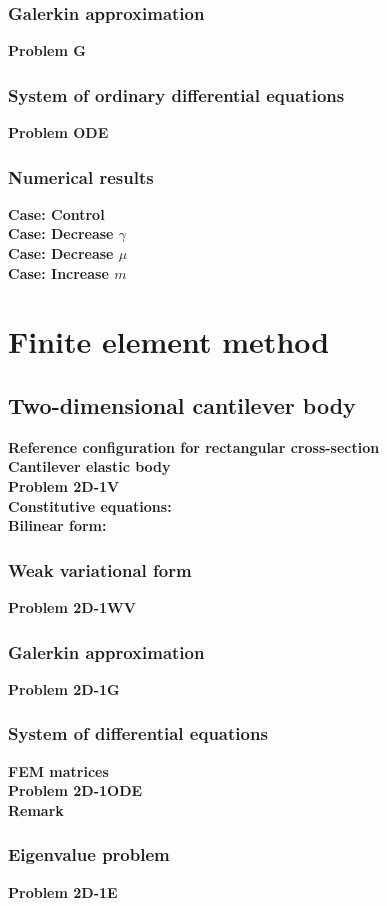 \documentclass[../main.tex]{subfiles}
\begin{document}
\subsubsection{Galerkin approximation}
\textbf{Problem G}
\subsubsection{System of ordinary differential equations}
\textbf{Problem ODE}
\subsubsection{Numerical results}
\textbf{Case: Control}\\
\textbf{Case: Decrease $\gamma $}\\
\textbf{Case: Decrease $\mu $}\\
\textbf{Case: Increase $m$}
\section{Finite element method}
\subsection{Two-dimensional cantilever body}
\textbf{Reference configuration for rectangular cross-section}\\
\textbf{Cantilever elastic body}\\
\textbf{Problem 2D-1V}\\
\textbf{Constitutive equations:}\\
\textbf{Bilinear form:}
\subsubsection{Weak variational form}
\textbf{Problem 2D-1WV}
\subsubsection{Galerkin approximation}
\textbf{Problem 2D-1G}
\subsubsection{System of differential equations}
\textbf{FEM matrices}\\
\textbf{Problem 2D-1ODE}\\
\textbf{Remark}
\subsubsection{Eigenvalue problem}
\textbf{Problem 2D-1E}
\end{document}
